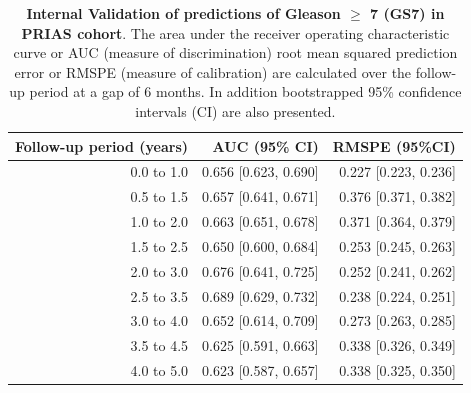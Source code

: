 \begin{table}[!htb]
\small\sf\centering
\caption{\textbf{Internal Validation of predictions of Gleason $\geq$ 7 (GS7) in PRIAS cohort}. The area under the receiver operating characteristic curve or AUC (measure of discrimination) root mean squared prediction error or RMSPE (measure of calibration) are calculated over the follow-up period at a gap of 6 months. In addition bootstrapped 95\% confidence intervals (CI) are also presented.}
\label{tab:AUC_PE_PRIAS}
\begin{tabular}{r|r|r}
\hline
\hline
Follow-up period (years) & AUC (95\% CI) & RMSPE (95\%CI)\\ 
\hline
0.0 to 1.0 & 0.656 [0.623, 0.690] & 0.227 [0.223, 0.236]\\
0.5 to 1.5 & 0.657 [0.641, 0.671] & 0.376 [0.371, 0.382]\\
1.0 to 2.0 & 0.663 [0.651, 0.678] & 0.371 [0.364, 0.379]\\
1.5 to 2.5 & 0.650 [0.600, 0.684] & 0.253 [0.245, 0.263]\\
2.0 to 3.0 & 0.676 [0.641, 0.725] & 0.252 [0.241, 0.262]\\
2.5 to 3.5 & 0.689 [0.629, 0.732] & 0.238 [0.224, 0.251]\\
3.0 to 4.0 & 0.652 [0.614, 0.709] & 0.273 [0.263, 0.285]\\
3.5 to 4.5 & 0.625 [0.591, 0.663] & 0.338 [0.326, 0.349]\\
4.0 to 5.0 & 0.623 [0.587, 0.657] & 0.338 [0.325, 0.350]\\
\hline
\end{tabular}	
\end{table}

